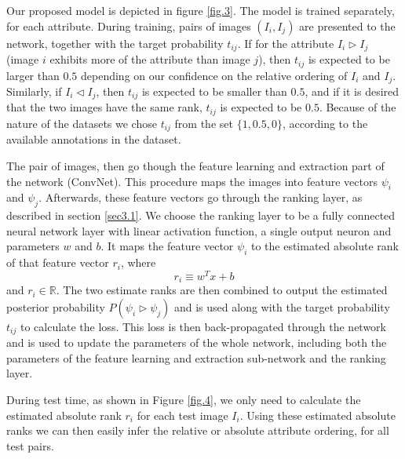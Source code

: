 Our proposed model is depicted in figure \ref{fig.3}. The model is trained separately, for each attribute. During training, pairs of images $(I_i, I_j)$ are presented to the network, together with the target probability $t_{ij}$. If for the attribute $I_i \triangleright I_j$ (image $i$ exhibits more of the attribute than image $j$), then $t_{ij}$ is expected to be larger than $0.5$ depending on our confidence on the relative ordering of $I_i$ and $I_j$. Similarly, if $I_i \triangleleft I_j$, then $t_{ij}$ is expected to be smaller than $0.5$, and if it is desired that the two images have the same rank, $t_{ij}$ is expected to be $0.5$. Because of the nature of the datasets we chose $t_{ij}$ from the set $\{1, 0.5, 0 \}$, according to the available annotations in the dataset.

The pair of images, then go though the feature learning and extraction part of the network (ConvNet). This procedure maps the images into feature vectors $\psi_i$ and $\psi_j$. Afterwards, these feature vectors go through the ranking layer, as described in section \ref{sec3.1}. We choose the ranking layer to be a fully connected neural network layer with linear activation function, a single output neuron and parameters $w$ and $b$. It maps the feature vector $\psi_i$ to the estimated absolute rank of that feature vector $r_i$, where
$$
r_i \equiv w^T x + b
$$
and $r_i \in \mathbb{R}$.
The two estimate ranks are then combined to output the estimated posterior probability $P(\psi_i \triangleright \psi_j)$ and is used along with the target probability $t_{ij}$ to calculate the loss. This loss is then back-propagated through the network and is used to update the parameters of the whole network, including both the parameters of the feature learning and extraction sub-network and the ranking layer.

During test time, as shown in Figure \ref{fig.4}, we only need to calculate the estimated absolute rank $r_i$ for each test image $I_i$. Using these estimated absolute ranks we can then easily infer the relative or absolute attribute ordering, for all test pairs.